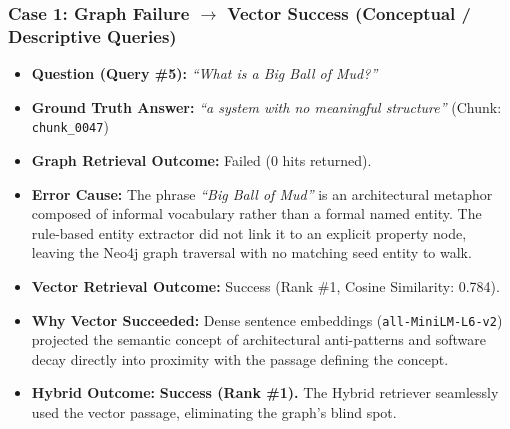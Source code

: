 \documentclass[11pt,a4paper]{article}
\begin{document}
\subsubsection{Case 1: Graph Failure $\to$ Vector Success (Conceptual / Descriptive Queries)}
\begin{itemize}[nosep]
  \item \textbf{Question (Query \#5):} \textit{``What is a Big Ball of Mud?''}
  \item \textbf{Ground Truth Answer:} \textit{``a system with no meaningful structure''} (Chunk: \texttt{chunk\_0047})
  \item \textbf{Graph Retrieval Outcome:} Failed (0 hits returned).
  \item \textbf{Error Cause:} The phrase \textit{``Big Ball of Mud''} is an architectural metaphor composed of informal vocabulary rather than a formal named entity. The rule-based entity extractor did not link it to an explicit property node, leaving the Neo4j graph traversal with no matching seed entity to walk.
  \item \textbf{Vector Retrieval Outcome:} Success (Rank \#1, Cosine Similarity: 0.784).
  \item \textbf{Why Vector Succeeded:} Dense sentence embeddings (\texttt{all-MiniLM-L6-v2}) projected the semantic concept of architectural anti-patterns and software decay directly into proximity with the passage defining the concept.
  \item \textbf{Hybrid Outcome:} \textbf{Success (Rank \#1).} The Hybrid retriever seamlessly used the vector passage, eliminating the graph's blind spot.
\end{itemize}
\end{document}
